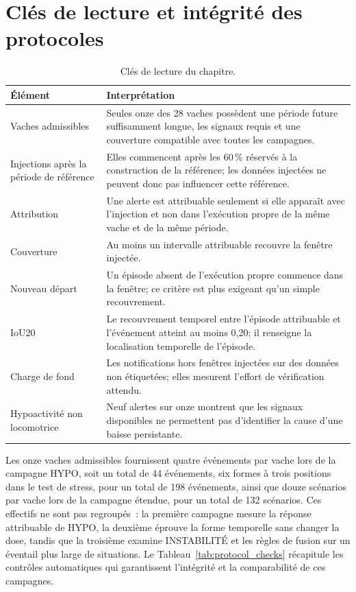 \section{Clés de lecture et intégrité des protocoles}
\begin{table}[H]
  \centering
  \caption{Clés de lecture du chapitre.}
  \label{tab:cles_lecture_resultats}
  \small
  \begin{tabular}{p{}p{}}
    \toprule
    Élément & Interprétation \\
    \midrule
    Vaches admissibles
      & Seules onze des 28 vaches possèdent une période future suffisamment longue, les signaux
        requis et une couverture compatible avec toutes les campagnes. \\
    Injections après la période de référence
      & Elles commencent après les 60\,\% réservés à la construction de la référence; les
        données injectées ne peuvent donc pas influencer cette référence. \\
    Attribution
      & Une alerte est attribuable seulement si elle apparaît avec l'injection et non dans
        l'exécution propre de la même vache et de la même période. \\
    Couverture
      & Au moins un intervalle attribuable recouvre la fenêtre injectée. \\
    Nouveau départ
      & Un épisode absent de l'exécution propre commence dans la fenêtre; ce critère est plus
        exigeant qu'un simple recouvrement. \\
    IoU20
      & Le recouvrement temporel entre l'épisode attribuable et l'événement atteint au moins
        0,20; il renseigne la localisation temporelle de l'épisode. \\
    Charge de fond
      & Les notifications hors fenêtres injectées sur des données non étiquetées; elles
        mesurent l'effort de vérification attendu. \\
    Hypoactivité non locomotrice
      & Neuf alertes sur onze montrent que les signaux disponibles ne permettent pas
        d'identifier la cause d'une baisse persistante. \\
    \bottomrule
  \end{tabular}
\end{table}

Les onze vaches admissibles fournissent quatre événements par vache lors de la campagne
HYPO, soit un total de 44 événements, six formes à trois positions dans le test de stress, pour
un total de 198 événements, ainsi que douze scénarios par vache lors de la campagne étendue,
pour un total de 132 scénarios. Ces effectifs ne sont
pas regroupés~: la première campagne mesure la réponse attribuable de HYPO, la deuxième
éprouve la forme temporelle sans changer la dose, tandis que la troisième examine
INSTABILITÉ et les règles de fusion sur un éventail plus large de situations. Le
Tableau~\ref{tab:protocol_checks} récapitule les contrôles automatiques qui garantissent
l'intégrité et la comparabilité de ces campagnes.

